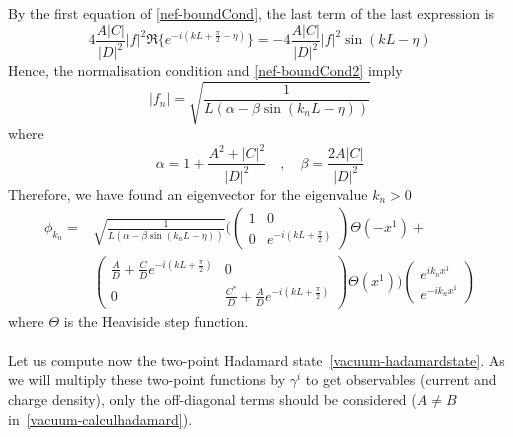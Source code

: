 By the first equation of \cref{nef-boundCond}, the last term of the last expression is 
\begin{equation*}
4\frac{A |C|}{|D|^2}| f|^2\Re\{e ^{-i(kL + \frac{\pi}{2} - \eta)}\} = 
- 4\frac{A |C|}{|D|^2}| f|^2\sin( kL - \eta) 
\end{equation*}
Hence, the normalisation condition and \cref{nef-boundCond2} imply
\begin{equation*}
 | f_{n} | =  \sqrt{\frac{1}{L(\alpha - \beta \sin (k_{n} L - \eta))}}  
\end{equation*}
where 
\begin{equation*}
\alpha = 1+\frac{A^2 + |C|^2}{|D|^2} \quad,\quad
\beta = \frac{2 A |C|}{|D|^2}
\end{equation*}
Therefore, we have found an eigenvector for the eigenvalue $k_n > 0$ 
\begin{equation}
\begin{split}
\phi_{k_{n}} = 
& \sqrt{\frac{1}{L(\alpha - \beta \sin (k_{n}L - \eta))}} \Bigg( 
\begin{pmatrix}
1 & 0 \\
0  & e^{-i(kL + \frac{\pi}{2})}
\end{pmatrix}
\Theta(-x^1) + \\
& \begin{pmatrix}
\frac{A}{D}  +  \frac{C}{D} e^{-i(kL + \frac{\pi}{2})} & 0 \\
0  & \frac{C^*}{D}  + \frac{A}{D}e^{-i(kL + \frac{\pi}{2})}
\end{pmatrix}\Theta(x^1)\Bigg)
\begin{pmatrix}
e^{ik_{n} x^1} \\
e^{- ik_{n} x^1}
\end{pmatrix}
\end{split}
\end{equation}
where $\Theta$ is the Heaviside step function.\\\\
Let us compute now the two-point Hadamard state~\cref{vacuum-hadamardstate}.
As we will multiply these two-point functions by $\gamma^i$ to get observables (current and charge density), only the off-diagonal terms should be considered ($A\neq B$ in~\cref{vacuum-calculhadamard}).
